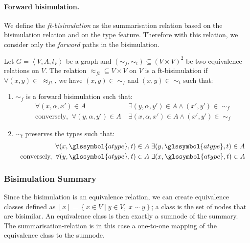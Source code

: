 \paragraph{Forward bisimulation.}

We define the \emph{ft-bisimulation} as the summarisation relation based on the bisimulation relation and on the type feature. Therefore with this relation, we consider only the \emph{forward} paths in the bisimulation.

\begin{definition}[FT-Bisimulation]
Let $G=\left\langle V, A, l_V \right\rangle$ be a graph and $(\sim_f, \sim_t) \subseteq (V \times V)^2$ be two equivalence relations on $V$.
The relation $\approx_{ft} \subseteq V \times V$ on $V$ is a ft-bisimulation if $\forall (x,y) \in\; \approx_{ft}$, we have $(x,y) \in\; \sim_f$ and $(x,y) \in\; \sim_t$ such that:
\begin{enumerate}
\item $\sim_f$ is a forward bisimulation such that:
$$
\begin{aligned}
\forall (x, \alpha, x') \in A&\; \exists (y, \alpha, y') \in A \wedge (x',y') \in\; \sim_f \\
\text{conversely,}\;\; \forall (y, \alpha, y') \in A&\; \exists (x, \alpha, x') \in A \wedge (x',y') \in\; \sim_f
\end{aligned}
$$

\item $\sim_t$ preserves the types such that:
$$
\begin{aligned}
\forall (x, \glssymbol{atype}, t) \in A&\; \exists (y, \glssymbol{atype}, t) \in A \\
\text{conversely,}\;\; \forall (y, \glssymbol{atype}, t) \in A&\; \exists (x, \glssymbol{atype}, t) \in A
\end{aligned}
$$

\end{enumerate}
\end{definition}

\subsubsection{Bisimulation Summary}
\label{sec:bisim-summary}

Since the bisimulation is an equivalence relation, we can create equivalence classes defined as $[x] = \left\lbrace x \in V \mid y \in V,\; x \sim y \right\rbrace$; a class is the set of nodes that are bisimilar. An equivalence class is then exactly a sumnode of the summary. The \gls{summarisation-relation} is in this case a one-to-one mapping of the equivalence class to the sumnode.

